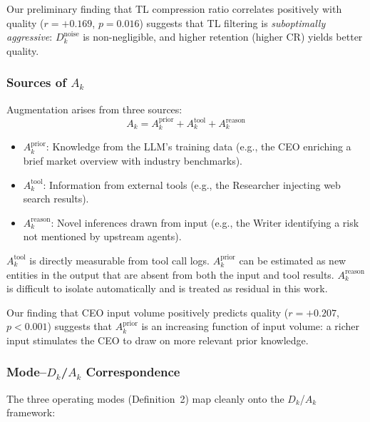\documentclass[conference]{IEEEtran}
\begin{document}
Our preliminary finding that TL compression ratio correlates positively with quality ($r = +0.169$, $p = 0.016$) suggests that TL filtering is \emph{suboptimally aggressive}: $D_k^{\text{noise}}$ is non-negligible, and higher retention (higher CR) yields better quality.

\subsubsection{Sources of $A_k$}

Augmentation arises from three sources:
\begin{equation}
    A_k = A_k^{\text{prior}} + A_k^{\text{tool}} + A_k^{\text{reason}}
\end{equation}

\begin{itemize}
    \item $A_k^{\text{prior}}$: Knowledge from the LLM's training data (e.g., the CEO enriching a brief market overview with industry benchmarks).
    \item $A_k^{\text{tool}}$: Information from external tools (e.g., the Researcher injecting web search results).
    \item $A_k^{\text{reason}}$: Novel inferences drawn from input (e.g., the Writer identifying a risk not mentioned by upstream agents).
\end{itemize}

$A_k^{\text{tool}}$ is directly measurable from tool call logs.
$A_k^{\text{prior}}$ can be estimated as new entities in the output that are absent from both the input and tool results.
$A_k^{\text{reason}}$ is difficult to isolate automatically and is treated as residual in this work.

Our finding that CEO input volume positively predicts quality ($r = +0.207$, $p < 0.001$) suggests that $A_k^{\text{prior}}$ is an increasing function of input volume: a richer input stimulates the CEO to draw on more relevant prior knowledge.

\subsubsection{Mode--$D_k$/$A_k$ Correspondence}

The three operating modes (Definition~2) map cleanly onto the $D_k$/$A_k$ framework:
\end{document}

